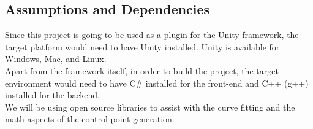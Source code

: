 \subsection{Assumptions and Dependencies}
Since this project is going to be used as a plugin for the Unity framework, the target platform would
need to have Unity installed. Unity is available for Windows, Mac, and Linux.\\
Apart from the framework itself, in order to build the project, the target environment
would need to have C\# installed for the front-end and C++ (g++) installed for the backend.\\
We will be using open source libraries to assist with the curve fitting and the math aspects
of the control point generation.
